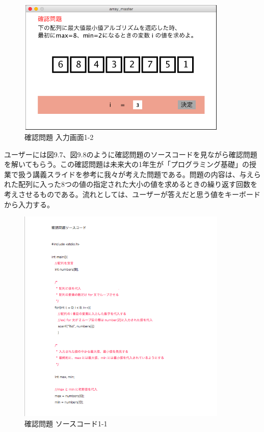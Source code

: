 \documentclass[openany,11pt,papersize]{jsbook}
\begin{document}
\begin{figure}[H]
\begin{center}
\includegraphics[width=10cm, bb=0 0 647 422]{img/9thParagraph/kakuninmondai_02.png}
\end{center}
\caption{確認問題 入力画面1-2}
\end{figure}

ユーザーには図9.7、図9.8のように確認問題のソースコードを見ながら確認問題を解いてもらう。この確認問題は未来大の1年生が「プログラミング基礎」の授業で扱う講義スライドを参考に我々が考えた問題である。問題の内容は、与えられた配列に入った8つの値の指定された大小の値を求めるときの繰り返す回数を考えさせるものである。流れとしては、ユーザーが答えだと思う値をキーボードから入力する。

\begin{figure}[H]
\begin{center}
\includegraphics[width=10cm, bb=0 0 557 576]{img/9thParagraph/kakuninmondai_03.png}
\end{center}
\caption{確認問題 ソースコード1-1}
\end{figure}
\end{document}
